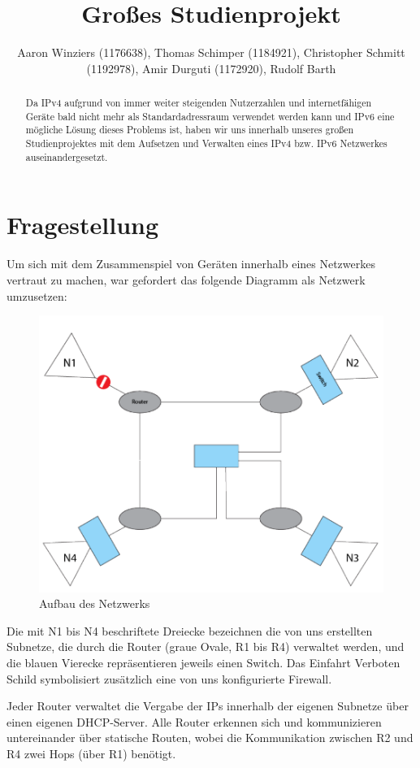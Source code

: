 \documentclass[11pt,a4paper]{article}
\author{Aaron Winziers (1176638), Thomas Schimper (1184921), Christopher Schmitt (1192978), Amir Durguti (1172920), Rudolf Barth}
\title{Großes Studienprojekt}
\begin{document}
\maketitle
\begin{abstract}
  Da IPv4 aufgrund von immer weiter steigenden Nutzerzahlen
  und internetfähigen Geräte bald nicht mehr als
  Standardadressraum verwendet werden kann und IPv6 eine
  mögliche Lösung dieses Problems ist, haben wir uns innerhalb
  unseres großen Studienprojektes mit dem Aufsetzen und
  Verwalten eines IPv4 bzw. IPv6 Netzwerkes
  auseinandergesetzt.
\end{abstract}
\section{Fragestellung}
Um sich mit dem Zusammenspiel von Geräten innerhalb eines
Netzwerkes vertraut zu machen, war gefordert das folgende
Diagramm als Netzwerk umzusetzen:
\begin{figure}[ht]
  \includegraphics[width=.8\linewidth]{./network_topography.png}
  \centering
  \caption{Aufbau des Netzwerks}
\end{figure}
\par
Die mit N1 bis N4 beschriftete Dreiecke bezeichnen die von uns
erstellten Subnetze, die durch die Router (graue Ovale, R1 bis R4)
verwaltet werden, und die blauen Vierecke repräsentieren jeweils einen
Switch. Das \glqq Einfahrt Verboten\grqq~ Schild symbolisiert
zusätzlich eine von uns konfigurierte Firewall.
\par
Jeder Router verwaltet die Vergabe der IPs innerhalb der eigenen
Subnetze über einen eigenen DHCP-Server. Alle Router erkennen sich und
kommunizieren untereinander über statische Routen, wobei die
Kommunikation zwischen R2 und R4 zwei Hops (über R1) benötigt.
\end{document}
